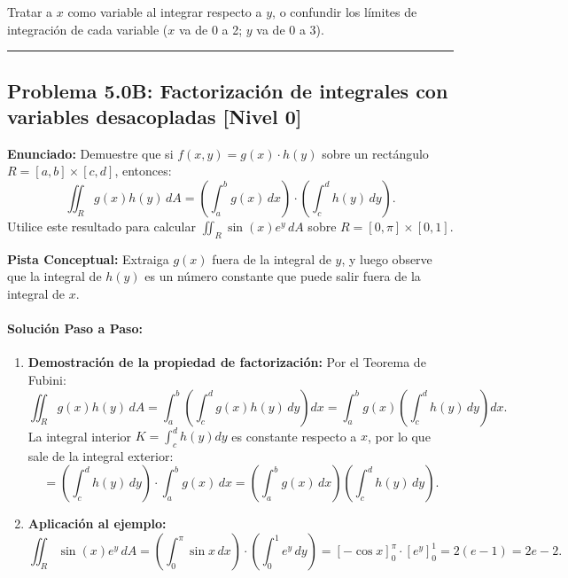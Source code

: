 \documentclass[11pt,a4paper]{article}
\begin{document}
\begin{trapbox}
Tratar a $x$ como variable al integrar respecto a $y$, o confundir los límites de integración de cada variable ($x$ va de 0 a 2; $y$ va de 0 a 3).
\end{trapbox}

\vspace{0.5cm}
\hrule
\vspace{0.5cm}
\subsection*{Problema 5.0B: Factorización de integrales con variables desacopladas \hfill \color{teal}\small[Nivel 0]}

\begin{tcolorbox}[colback=white,colframe=gray!40,arc=1mm,boxrule=0.5pt,left=3mm,right=3mm,top=2mm,bottom=2mm]
\textbf{Enunciado:} Demuestre que si $f(x,y) = g(x) \cdot h(y)$ sobre un rectángulo $R = [a,b] \times [c,d]$, entonces:
\[ \iint_R g(x)h(y) \, dA = \left( \int_a^b g(x) \, dx \right) \cdot \left( \int_c^d h(y) \, dy \right). \]
Utilice este resultado para calcular $\iint_R \sin(x) e^y \, dA$ sobre $R = [0, \pi] \times [0, 1]$.
\end{tcolorbox}

\begin{tcolorbox}[colback=yellow!4,colframe=accentamber!70,arc=1mm,boxrule=0.5pt,left=3mm,right=3mm,top=1.5mm,bottom=1.5mm]
\textbf{Pista Conceptual:} Extraiga $g(x)$ fuera de la integral de $y$, y luego observe que la integral de $h(y)$ es un número constante que puede salir fuera de la integral de $x$.
\end{tcolorbox}

\paragraph{Solución Paso a Paso:}\par
\begin{enumerate}[label=\textbf{\arabic*.}]
\item \textbf{Demostración de la propiedad de factorización:}
Por el Teorema de Fubini:
\[ \iint_R g(x)h(y) \, dA = \int_a^b \left( \int_c^d g(x)h(y) \, dy \right) dx = \int_a^b g(x) \left( \int_c^d h(y) \, dy \right) dx. \]
La integral interior $K = \int_c^d h(y) dy$ es constante respecto a $x$, por lo que sale de la integral exterior:
\[ = \left( \int_c^d h(y) \, dy \right) \cdot \int_a^b g(x) \, dx = \left( \int_a^b g(x) \, dx \right) \left( \int_c^d h(y) \, dy \right). \]
\item \textbf{Aplicación al ejemplo:}
\[ \iint_R \sin(x) e^y \, dA = \left( \int_0^\pi \sin x \, dx \right) \cdot \left( \int_0^1 e^y \, dy \right) = [-\cos x]_0^\pi \cdot [e^y]_0^1 = 2(e - 1) = 2e - 2. \]
\end{enumerate}
\end{document}
